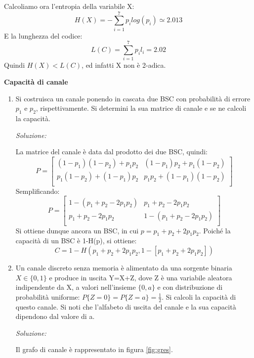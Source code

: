 \begin{enumerate}
Calcoliamo ora l'entropia della variabile X:
\[
 H(X)=-\sum_{i=1}^7 p_i log(p_i) \simeq 2.013
\]
E la lunghezza del codice:
\[
 L(C)=\sum_{i=1}^7 p_i l_i =2.02
\]
Quindi $H(X)<L(C)$, ed infatti X non è 2-adica.
\bigskip
\end{enumerate}


\textbf{Capacità di canale}

\begin{enumerate}
 \item Si costruisca un canale ponendo in cascata due BSC con probabilità di errore $p_1$ e $p_2$, rispettivamente.
       Si determini la sua matrice di canale e se ne calcoli la capacità.
       \bigskip
       \bigskip

       \textit{Soluzione:}

       \noindent
       La matrice del canale è data dal prodotto dei due BSC, quindi:
      \[
       P = \left[
         \begin{array}{cc}
         (1-p_1)(1-p_2) + p_1 p_2 & (1-p_1)p_2 + p_1(1-p_2) \\
         p_1 (1-p_2)+(1-p_1)p_2 & p_1 p_2 +(1-p_1)(1-p_2)\\
         \end{array} \right]
      \]
      Semplificando:
      \[
       P = \left[
         \begin{array}{cc}
         1-(p_1+p_2-2p_1p_2) & p_1+p_2-2p_1p_2 \\
         p_1+p_2-2p_1p_2 & 1-(p_1+p_2-2p_1p_2)\\
         \end{array} \right]
      \]
      Si ottiene dunque ancora un BSC, in cui $p=p_1+p_2+2p_1p_2$.
      Poiché la capacità di un BSC è 1-H(p), si ottiene:
      \[
       C=1-H(p_1+p_2+2p_1p_2,1-[p_1+p_2+2p_1p_2])
      \]
      \bigskip

 \item Un canale discreto senza memoria è alimentato da una sorgente binaria $X \in \{0,1\}$ e produce in uscita 
       Y=X+Z, dove Z è una variabile aleatora indipendente da X, a valori nell'insieme $\{0,a\}$ e con distribuzione 
       di probabilità uniforme: $P\{Z=0\}=P\{Z=a\}=\frac{1}{2}$. Si calcoli la capacità di questo canale.
       Si noti che l'alfabeto di uscita del canale e la sua capacità dipendono dal valore di a.
       \bigskip
       \bigskip

       \textit{Soluzione:}

       \noindent
       Il grafo di canale è rappresentato in figura \ref{fig:gres}.


\end{enumerate}
